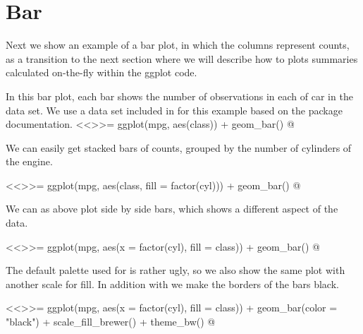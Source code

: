 \section{Bar}
Next we show an example of a bar plot, in which the columns represent counts, as a transition to the next section where we will describe how to plots summaries calculated on-the-fly within the ggplot code.

In this bar plot, each bar shows the number of observations in each  of car in the data set. We use a data set included in \ggplot for this example based on the package documentation.
<<>>=
ggplot(mpg, aes(class)) + geom_bar()
@

We can easily get stacked bars of counts, grouped by the number of cylinders of the engine.

<<>>=
ggplot(mpg, aes(class, fill = factor(cyl))) +
   geom_bar()
@

We can as above plot side by side bars, which shows a different aspect of the data.

<<>>=
ggplot(mpg, aes(x = factor(cyl), fill = class)) +
   geom_bar()
@

The default palette used for  is rather ugly, so we also show the same plot with another scale for fill. In addition with  we make the borders of the bars black.

<<>>=
ggplot(mpg, aes(x = factor(cyl), fill = class)) +
  geom_bar(color = "black") +
  scale_fill_brewer() +
  theme_bw()
@

